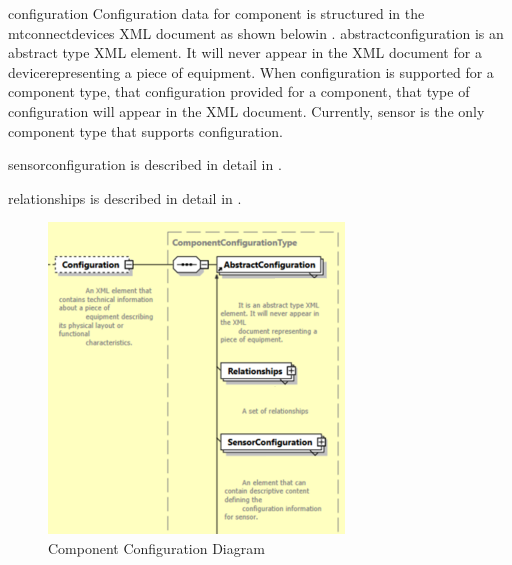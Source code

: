 \documentclass{mtconnect}	%
\providecommand{\DIFadd}[1]{{\hspace{0pt}\protect\color{blue}#1}} %
\providecommand{\DIFdel}[1]{{\hspace{0pt}\protect\color{red}#1}}                      %
\providecommand{\DIFaddbegin}{} %
\providecommand{\DIFaddend}{} %
\providecommand{\DIFdelbegin}{} %
\providecommand{\DIFdelend}{} %
\providecommand{\DIFaddbeginFL}{} %
\providecommand{\DIFaddendFL}{} %
\providecommand{\DIFdelbeginFL}{} %
\providecommand{\DIFdelendFL}{} %
\begin{document}
\DIFdelbegin \DIFdel{\gls{configuration} }\DIFdelend \DIFaddbegin \DIFadd{Configuration }\DIFaddend data for \gls{component} is structured in the \gls{mtconnectdevices} XML document as shown \DIFdelbegin \DIFdel{below}\DIFdelend \DIFaddbegin \DIFadd{in }\DIFaddend .   \gls{abstractconfiguration} is an abstract type XML element.   It will never appear in the XML document \DIFdelbegin \DIFdel{for a device}\DIFdelend \DIFaddbegin \DIFadd{representing a piece of equipment}\DIFaddend .    When \gls{configuration} is \DIFdelbegin \DIFdel{supported for a \gls{component} type, that configuration }\DIFdelend \DIFaddbegin \DIFadd{provided for a component, that type of \gls{configuration} }\DIFaddend will appear in the XML document.
\DIFdelbegin \DIFdel{Currently, \gls{sensor} is the only component type that supports \gls{configuration}.  }\DIFdelend \DIFaddbegin 

\DIFaddend \gls{sensorconfiguration} is described in detail in .

\DIFaddbegin \DIFadd{\gls{relationships} is described in detail in \sect{Relationships}.
}\DIFaddend \begin{figure}[ht]
  \centering
  \DIFdelbeginFL %
\DIFdelendFL \DIFaddbeginFL \includegraphics[width=0.7\textwidth]{figures/component-configuration-schema-diagram.png}
  \DIFaddendFL \caption{Component Configuration Diagram}
  \label{fig:component-configuration-schema-diagram}
\end{figure}\FloatBarrier
\end{document}
